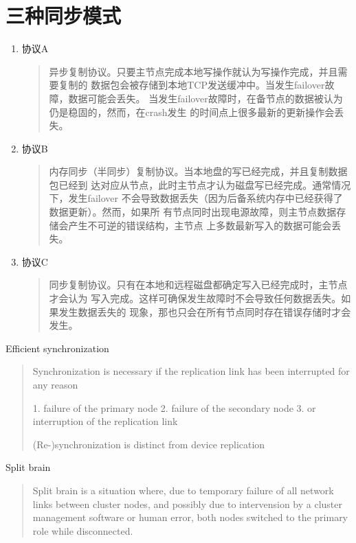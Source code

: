 \section{三种同步模式}

\begin{enumerate}[itemsep=0pt,parsep=0pt]
\item 协议A
\begin{quote}
异步复制协议。只要主节点完成本地写操作就认为写操作完成，并且需要复制的
数据包会被存储到本地TCP发送缓冲中。当发生failover故障，数据可能会丢失。
当发生failover故障时，在备节点的数据被认为仍是稳固的，然而，在crash发生
的时间点上很多最新的更新操作会丢失。
\end{quote}

\item 协议B
\begin{quote}
内存同步（半同步）复制协议。当本地盘的写已经完成，并且复制数据包已经到
达对应从节点，此时主节点才认为磁盘写已经完成。通常情况下，发生failover
不会导致数据丢失（因为后备系统内存中已经获得了数据更新）。然而，如果所
有节点同时出现电源故障，则主节点数据存储会产生不可逆的错误结构，主节点
上多数最新写入的数据可能会丢失。
\end{quote}

\item 协议C
\begin{quote}
同步复制协议。只有在本地和远程磁盘都确定写入已经完成时，主节点才会认为
写入完成。这样可确保发生故障时不会导致任何数据丢失。如果发生数据丢失的
现象，那也只会在所有节点同时存在错误存储时才会发生。
\end{quote}
\end{enumerate}

Efficient synchronization
\begin{quote}
Synchronization is necessary if the replication link has been
interrupted for any reason

1. failure of the primary node
2. failure of the secondary node
3. or interruption of the replication link

(Re-)synchronization is distinct from device replication
\end{quote}

Split brain
\begin{quote}
Split brain is a situation where, due to temporary failure of all
network links between cluster nodes, and possibly due to intervension
by a cluster management software or human error, both nodes switched
to the primary role while disconnected.
\end{quote}

